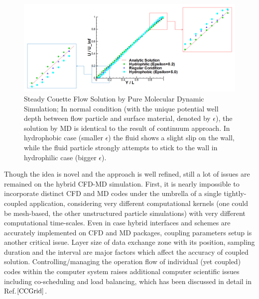 \documentclass{CFD2010paper}
\begin{document}
%
\begin{figure}[ht]
\centering
\includegraphics[width=0.9\linewidth]{MD_Solution.pdf}
\vskip-0.2cm
\caption{Steady Couette Flow Solution by Pure Molecular Dynamic Simulation; In normal condition (with the unique potential well depth between flow particle and surface material, denoted by $\epsilon$), the solution by MD is identical to the result of continuum approach. In hydrophobic case (smaller $\epsilon$) the fluid shows a slight slip on the wall, while the fluid particle strongly attempts to stick to the wall in hydrophilic case (bigger $\epsilon$).}
\label{MD_Solution}
\end{figure}



Though the idea is novel and the approach is well refined, still a lot of issues are remained on the hybrid CFD-MD simulation. First, it is nearly impossible to incorporate distinct CFD and MD codes under the umbrella of a single tightly-coupled application, considering very different computational kernels (one could be mesh-based, the other unstructured particle simulations) with very different computational time-scales. Even in case hybrid interfaces and schemes are accurately implemented on CFD and MD packages, coupling parameters setup is another critical issue. Layer size of data exchange zone with its position, sampling duration and the interval are major factors which affect the accuracy of coupled solution. Controlling/managing the operation flow of individual (yet coupled) codes within the computer system raises additional computer scientific issues including co-scheduling and load balancing, which has been discussed in detail in Ref.${\cite{CCGrid}}$.
\end{document}
